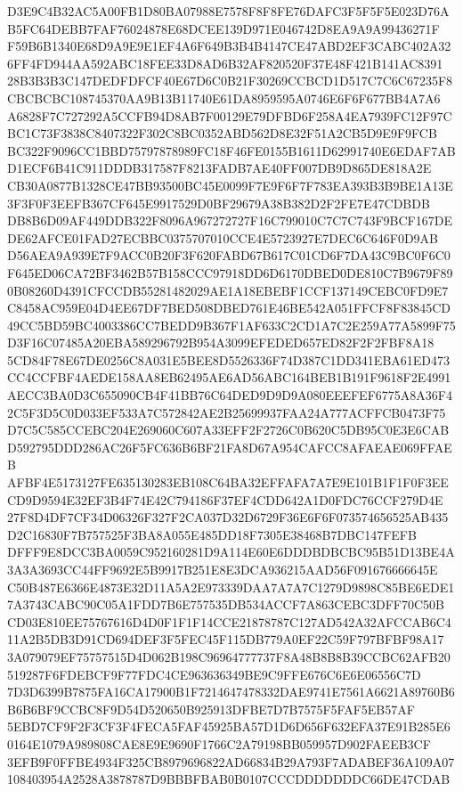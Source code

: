 \documentclass[UTF8,fontset=fandol,zihao=-4,a4paper]{ctexart}
\begin{document}
{{D3E9C4B32AC5A00FB1D80BA07988E7578F8F8FE76DAFC3F5F5F5E023D76AB5FC64DEBB7FAF76024878E68DCEE139D971E046742D8EA9A9A99436271F
F59B6B1340E68D9A9E9E1EF4A6F649B3B4B4147CE47ABD2EF3CABC402A326FF4FD944AA592ABC18FEE33D8AD6B32AF820520F37E48F421B141AC8391
28B3B3B3C147DEDFDFCF40E67D6C0B21F30269CCBCD1D517C7C6C67235F8CBCBCBC108745370AA9B13B11740E61DA8959595A0746E6F6F677BB4A7A6
A6828F7C727292A5CCFB94D8AB7F00129E79DFBD6F258A4EA7939FC12F97CBC1C73F3838C8407322F302C8BC0352ABD562D8E32F51A2CB5D9E9F9FCB
BC322F9096CC1BBD75797878989FC18F46FE0155B1611D62991740E6EDAF7ABD1ECF6B41C911DDDB317587F8213FADB7AE40FF007DB9D865DE818A2E
CB30A0877B1328CE47BB93500BC45E0099F7E9F6F7F783EA393B3B9BE1A13E3F3F0F3EEFB367CF645E9917529D0BF29679A38B382D2F2FE7E47CDBDB
DB8B6D09AF449DDB322F8096A967272727F16C799010C7C7C743F9BCF167DEDE62AFCE01FAD27ECBBC0375707010CCE4E5723927E7DEC6C646F0D9AB
D56AEA9A939E7F9ACC0B20F3F620FABD67B617C01CD6F7DA43C9BC0F6C0F645ED06CA72BF3462B57B158CCC97918DD6D6170DBED0DE810C7B9679F89
0B08260D4391CFCCDB55281482029AE1A18EBEBF1CCF137149CEBC0FD9E7C8458AC959E04D4EE67DF7BED508DBED761E46BE542A051FFCF8F83845CD
49CC5BD59BC4003386CC7BEDD9B367F1AF633C2CD1A7C2E259A77A5899F75D3F16C07485A20EBA589296792B954A3099EFEDED657ED82F2F2FBF8A18
5CD84F78E67DE0256C8A031E5BEE8D5526336F74D387C1DD341EBA61ED473CC4CCFBF4AEDE158AA8EB62495AE6AD56ABC164BEB1B191F9618F2E4991
AECC3BA0D3C655090CB4F41BB76C64DED9D9D9A080EEEFEF6775A8A36F42C5F3D5C0D033EF533A7C572842AE2B25699937FAA24A777ACFFCB0473F75
D7C5C585CCEBC204E269060C607A33EFF2F2726C0B620C5DB95C0E3E6CABD592795DDD286AC26F5FC636B6BF21FA8D67A954CAFCC8AFAEAE069FFAEB
AFBF4E5173127FE635130283EB108C64BA32EFFAFA7A7E9E101B1F1F0F3EECD9D9594E32EF3B4F74E42C794186F37EF4CDD642A1D0FDC76CCF279D4E
27F8D4DF7CF34D06326F327F2CA037D32D6729F36E6F6F073574656525AB435D2C16830F7B757525F3BA8A055E485DD18F7305E38468B7DBC147FEFB
DFFF9E8DCC3BA0059C952160281D9A114E60E6DDDBDBCBC95B51D13BE4A3A3A3693CC44FF9692E5B9917B251E8E3DCA936215AAD56F091676666645E
C50B487E6366E4873E32D11A5A2E973339DAA7A7A7C1279D9898C85BE6EDE17A3743CABC90C05A1FDD7B6E757535DB534ACCF7A863CEBC3DFF70C50B
CD03E810EE75767616D4D0F1F1F14CCE21878787C127AD542A32AFCCAB6C411A2B5DB3D91CD694DEF3F5FEC45F115DB779A0EF22C59F797BFBF98A17
3A079079EF75757515D4D062B198C96964777737F8A48B8B8B39CCBC62AFB20519287F6FDEBCF9F77FDC4CE963636349BE9C9FFE676C6E6E06556C7D
7D3D6399B7875FA16CA17900B1F7214647478332DAE9741E7561A6621A89760B6B6B6BF9CCBC8F9D54D520650B925913DFBE7D7B7575F5FAF5EB57AF
5EBD7CF9F2F3CF3F4FECA5FAF45925BA57D1D6D656F632EFA37E91B285E60164E1079A989808CAE8E9E9690F1766C2A79198BB059957D902FAEEB3CF
3EFB9F0FFBE4934F325CB8979696822AD66834B29A793F7ADABEF36A109A07108403954A2528A3878787D9BBBFBAB0B0107CCCDDDDDDDC66DE47CDAB
}}
\end{document}
